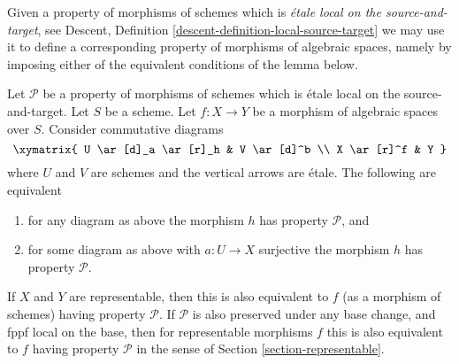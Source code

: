 \noindent
Given a property of morphisms of schemes which is {\it \'etale local on the
source-and-target}, see
Descent, Definition \ref{descent-definition-local-source-target}
we may use it to define a corresponding
property of morphisms of algebraic spaces, namely by imposing either of
the equivalent conditions of the lemma below.

\begin{lemma}
\label{lemma-local-source-target}
Let $\mathcal{P}$ be a property of morphisms of schemes
which is \'etale local on the source-and-target.
Let $S$ be a scheme.
Let $f : X \to Y$ be a morphism of algebraic spaces over $S$.
Consider commutative diagrams
$$
\xymatrix{
U \ar[d]_a \ar[r]_h & V \ar[d]^b \\
X \ar[r]^f & Y
}
$$
where $U$ and $V$ are schemes and the vertical arrows are \'etale.
The following are equivalent
\begin{enumerate}
\item for any diagram as above the morphism $h$ has property
$\mathcal{P}$, and
\item for some diagram as above with $a : U \to X$ surjective
the morphism $h$ has property $\mathcal{P}$.
\end{enumerate}
If $X$ and $Y$ are representable, then this is also equivalent to
$f$ (as a morphism of schemes) having property $\mathcal{P}$.
If $\mathcal{P}$ is also preserved under any base change, and
fppf local on the base, then for representable morphisms $f$ this
is also equivalent to $f$ having property $\mathcal{P}$ in the sense
of Section \ref{section-representable}.
\end{lemma}

